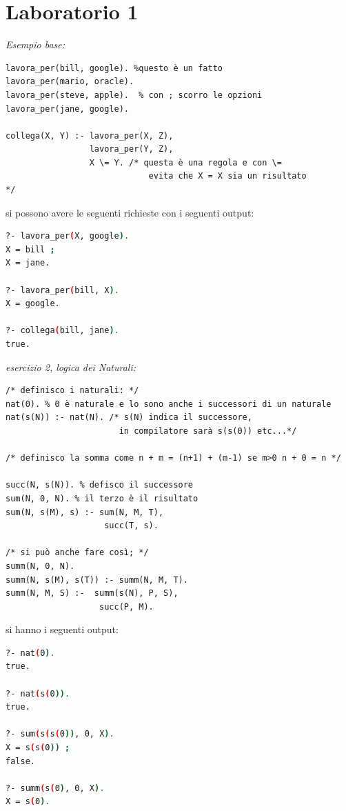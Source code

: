 \documentclass[a4paper,12pt, oneside]{book}
\begin{document}
\section{Laboratorio 1}
\begin{esercizio}
\textit{Esempio base:}
\begin{verbatim}
lavora_per(bill, google). %questo è un fatto
lavora_per(mario, oracle).
lavora_per(steve, apple).  % con ; scorro le opzioni
lavora_per(jane, google).

collega(X, Y) :- lavora_per(X, Z),
                 lavora_per(Y, Z),
                 X \= Y. /* questa è una regola e con \= 
                             evita che X = X sia un risultato 	                          */
\end{verbatim}
si possono avere le seguenti richieste con i seguenti output:
\begin{shaded}
\begin{lstlisting}[language=bash]
?- lavora_per(X, google).
X = bill ;
X = jane.

?- lavora_per(bill, X).
X = google.

?- collega(bill, jane).
true.
\end{lstlisting}
\end{shaded}
\end{esercizio}
\newpage
\begin{esercizio}
\textit{esercizio 2, logica dei Naturali:}
\begin{verbatim}
/* definisco i naturali: */
nat(0). % 0 è naturale e lo sono anche i successori di un naturale
nat(s(N)) :- nat(N). /* s(N) indica il successore, 
                       in compilatore sarà s(s(0)) etc...*/

/* definisco la somma come n + m = (n+1) + (m-1) se m>0 n + 0 = n */

succ(N, s(N)). % defisco il successore
sum(N, 0, N). % il terzo è il risultato
sum(N, s(M), s) :- sum(N, M, T),
                    succ(T, s).

/* si può anche fare così; */
summ(N, 0, N).
summ(N, s(M), s(T)) :- summ(N, M, T).
summ(N, M, S) :-  summ(s(N), P, S),
                   succ(P, M).
\end{verbatim}
si hanno i seguenti output:
\begin{shaded}
\begin{lstlisting}[language=bash]
?- nat(0).
true.

?- nat(s(0)).
true.

?- sum(s(s(0)), 0, X).
X = s(s(0)) ;
false.

?- summ(s(0), 0, X).
X = s(0).
\end{lstlisting}
\end{shaded}
\end{esercizio}
\end{document}
